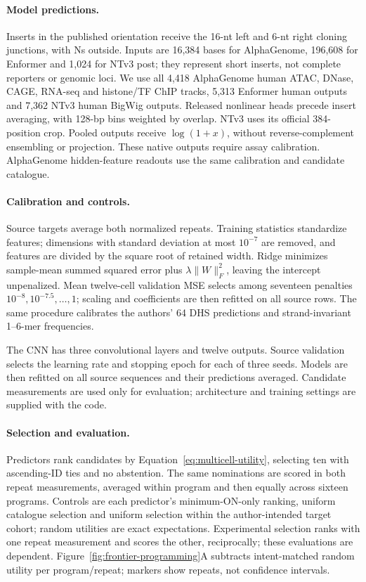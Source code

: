 \paragraph{Model predictions.}
Inserts in the published orientation receive the 16-nt left and 6-nt right cloning
junctions, with Ns outside. Inputs are 16,384 bases for AlphaGenome, 196,608 for
Enformer and 1,024 for NTv3 post; they represent short inserts, not complete
reporters or genomic loci. We use all 4,418 AlphaGenome human ATAC, DNase, CAGE,
RNA-seq and histone/TF ChIP tracks, 5,313 Enformer human outputs and 7,362 NTv3
human BigWig outputs. Released nonlinear heads precede insert averaging, with
128-bp bins weighted by overlap. NTv3 uses its official 384-position crop.
Pooled outputs receive $\log(1+x)$, without reverse-complement ensembling or
projection. These native outputs require assay calibration.
AlphaGenome hidden-feature readouts use the same calibration and candidate catalogue.

\paragraph{Calibration and controls.}
Source targets average both normalized repeats. Training statistics standardize
features; dimensions with standard deviation at most $10^{-7}$ are removed,
and features are divided by the square root of retained width. Ridge minimizes
sample-mean summed squared error plus $\lambda\lVert W\rVert_F^2$, leaving the
intercept unpenalized. Mean twelve-cell validation MSE selects among seventeen
penalties $10^{-8},10^{-7.5},\ldots,1$; scaling and coefficients are then refitted
on all source rows. The same procedure calibrates the authors' 64 DHS predictions
and strand-invariant 1--6-mer frequencies.

The CNN has three convolutional layers and twelve outputs. Source validation
selects the learning rate and stopping epoch for each of three seeds. Models
are then refitted on all source sequences and their predictions averaged.
Candidate measurements are used only for evaluation; architecture and training
settings are supplied with the code.

\paragraph{Selection and evaluation.}
Predictors rank candidates by Equation~\ref{eq:multicell-utility}, selecting ten
with ascending-ID ties and no abstention.
The same nominations are scored in both repeat measurements, averaged within program
and then equally across sixteen programs.
Controls are each predictor's minimum-ON-only ranking, uniform catalogue selection
and uniform selection within the author-intended target cohort; random utilities
are exact expectations. Experimental selection ranks with one repeat measurement and
scores the other, reciprocally; these evaluations are dependent.
Figure~\ref{fig:frontier-programming}A subtracts
intent-matched random utility per program/repeat; markers show repeats, not
confidence intervals.

